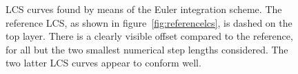 \begin{figure}[htpb]
    \centering
    
    \caption[LCS curves found by means of the Euler integration scheme]{
        LCS curves found by means of the Euler integration scheme. The
        reference LCS, as shown in figure~\ref{fig:referencelcs},
        is dashed on the top layer. There is a clearly visible offset
        compared to the reference, for all but the two smallest numerical step
        lengths considered. The two latter LCS curves appear to conform well.}
    \label{fig:lcs_euler}
\end{figure}
